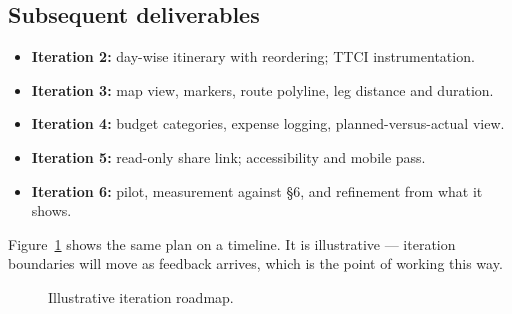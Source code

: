\documentclass[11pt,a4paper]{article}
\begin{document}
\subsection{Subsequent deliverables}
\begin{itemize}[leftmargin=0.7cm]
    \item \textbf{Iteration 2:} day-wise itinerary with
      reordering; TTCI instrumentation.
    \item \textbf{Iteration 3:} map view, markers,
      route polyline, leg distance and duration.
    \item \textbf{Iteration 4:} budget categories,
      expense logging, planned-versus-actual view.
    \item \textbf{Iteration 5:} read-only share link;
      accessibility and mobile pass.
    \item \textbf{Iteration 6:} pilot, measurement
      against \S6, and refinement from what it shows.
\end{itemize}

Figure~\ref{fig:roadmap} shows the same plan on a
timeline. It is illustrative --- iteration boundaries
will move as feedback arrives, which is the point of
working this way.

\begin{figure}[htbp]
\centering
{}
\caption{Illustrative iteration roadmap.}
\label{fig:roadmap}
\end{figure}
\end{document}
